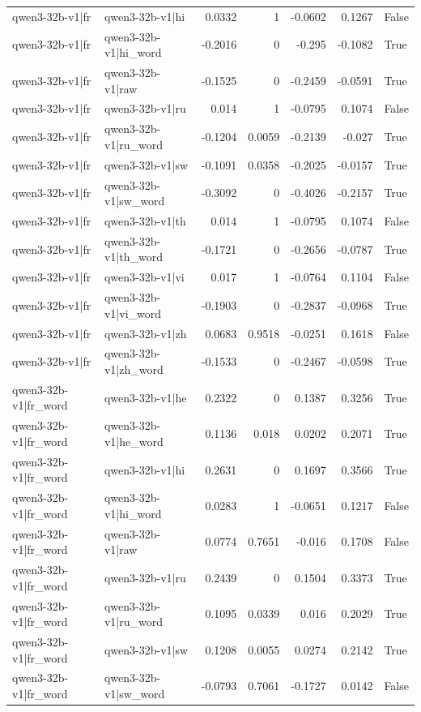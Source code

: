 \begin{table}
\begin{tabular}{l l r r r r l}
qwen3-32b-v1|fr & qwen3-32b-v1|hi & 0.0332 & 1 & -0.0602 & 0.1267 & False \\
qwen3-32b-v1|fr & qwen3-32b-v1|hi_word & -0.2016 & 0 & -0.295 & -0.1082 & True \\
qwen3-32b-v1|fr & qwen3-32b-v1|raw & -0.1525 & 0 & -0.2459 & -0.0591 & True \\
qwen3-32b-v1|fr & qwen3-32b-v1|ru & 0.014 & 1 & -0.0795 & 0.1074 & False \\
qwen3-32b-v1|fr & qwen3-32b-v1|ru_word & -0.1204 & 0.0059 & -0.2139 & -0.027 & True \\
qwen3-32b-v1|fr & qwen3-32b-v1|sw & -0.1091 & 0.0358 & -0.2025 & -0.0157 & True \\
qwen3-32b-v1|fr & qwen3-32b-v1|sw_word & -0.3092 & 0 & -0.4026 & -0.2157 & True \\
qwen3-32b-v1|fr & qwen3-32b-v1|th & 0.014 & 1 & -0.0795 & 0.1074 & False \\
qwen3-32b-v1|fr & qwen3-32b-v1|th_word & -0.1721 & 0 & -0.2656 & -0.0787 & True \\
qwen3-32b-v1|fr & qwen3-32b-v1|vi & 0.017 & 1 & -0.0764 & 0.1104 & False \\
qwen3-32b-v1|fr & qwen3-32b-v1|vi_word & -0.1903 & 0 & -0.2837 & -0.0968 & True \\
qwen3-32b-v1|fr & qwen3-32b-v1|zh & 0.0683 & 0.9518 & -0.0251 & 0.1618 & False \\
qwen3-32b-v1|fr & qwen3-32b-v1|zh_word & -0.1533 & 0 & -0.2467 & -0.0598 & True \\
qwen3-32b-v1|fr_word & qwen3-32b-v1|he & 0.2322 & 0 & 0.1387 & 0.3256 & True \\
qwen3-32b-v1|fr_word & qwen3-32b-v1|he_word & 0.1136 & 0.018 & 0.0202 & 0.2071 & True \\
qwen3-32b-v1|fr_word & qwen3-32b-v1|hi & 0.2631 & 0 & 0.1697 & 0.3566 & True \\
qwen3-32b-v1|fr_word & qwen3-32b-v1|hi_word & 0.0283 & 1 & -0.0651 & 0.1217 & False \\
qwen3-32b-v1|fr_word & qwen3-32b-v1|raw & 0.0774 & 0.7651 & -0.016 & 0.1708 & False \\
qwen3-32b-v1|fr_word & qwen3-32b-v1|ru & 0.2439 & 0 & 0.1504 & 0.3373 & True \\
qwen3-32b-v1|fr_word & qwen3-32b-v1|ru_word & 0.1095 & 0.0339 & 0.016 & 0.2029 & True \\
qwen3-32b-v1|fr_word & qwen3-32b-v1|sw & 0.1208 & 0.0055 & 0.0274 & 0.2142 & True \\
qwen3-32b-v1|fr_word & qwen3-32b-v1|sw_word & -0.0793 & 0.7061 & -0.1727 & 0.0142 & False \\

\end{tabular}
\end{table}
